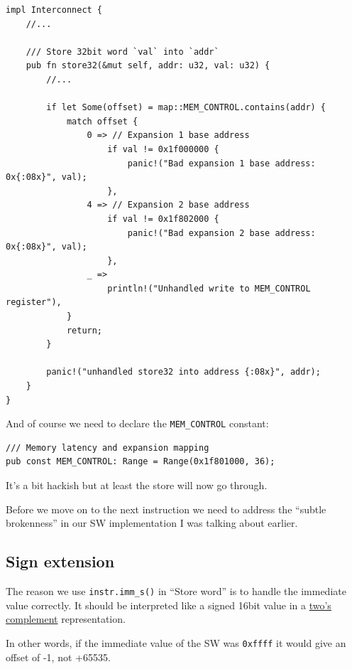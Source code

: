 \documentclass[a4paper]{article}
\newcommand{\code}[1] {\texttt{#1}}
\begin{document}
\begin{lstlisting}
impl Interconnect {
    //...

    /// Store 32bit word `val` into `addr`
    pub fn store32(&mut self, addr: u32, val: u32) {
        //...

        if let Some(offset) = map::MEM_CONTROL.contains(addr) {
            match offset {
                0 => // Expansion 1 base address
                    if val != 0x1f000000 {
                        panic!("Bad expansion 1 base address: 0x{:08x}", val);
                    },
                4 => // Expansion 2 base address
                    if val != 0x1f802000 {
                        panic!("Bad expansion 2 base address: 0x{:08x}", val);
                    },
                _ =>
                    println!("Unhandled write to MEM_CONTROL register"),
            }
            return;
        }

        panic!("unhandled store32 into address {:08x}", addr);
    }
}
\end{lstlisting}

And of course we need to declare the \code{MEM\_CONTROL} constant:

\begin{lstlisting}
/// Memory latency and expansion mapping
pub const MEM_CONTROL: Range = Range(0x1f801000, 36);
\end{lstlisting}

It's a bit hackish but at least the store will now go through.

Before we move on to the next instruction we need to address the
``subtle brokenness'' in our SW implementation I was talking about
earlier.
\fi
\subsection{Sign extension}
\label{subsection:signextension}
The reason we use \code{instr.imm\_s()} in ``Store word'' is to handle the
immediate value correctly. It should be
interpreted like a signed 16bit value in a
\href{https://en.wikipedia.org/wiki/Two%27s_complement}{two's complement}
representation.

In other words, if the immediate value of the SW was \code{0xffff}
it would give an offset of -1, not +65535.
\end{document}
